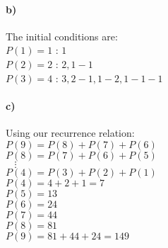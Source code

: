 \documentclass[12pt]{article}
\begin{document}
\paragraph{b)}
The initial conditions are: \\
$P(1)= 1$ : $1$ \\
$P(2)=2$ : $2,1-1$ \\
$P(3)=4$ : $3,2-1,1-2,1-1-1$ \\

\paragraph{c)}
Using our recurrence relation: \\
$P(9) = P(8) + P(7) + P(6)$\\
$P(8) = P(7) + P(6) + P(5)$\\
      $\ \ \ \ \vdots$\\
$P(4) = P(3) + P(2) + P(1)$\\
$P(4) = 4+2+1=7$\\
$P(5) = 13$\\
$P(6) = 24$\\
$P(7) = 44$\\
$P(8) = 81$\\
$P(9) = 81+ 44+24 = 149$\\
\end{document}
